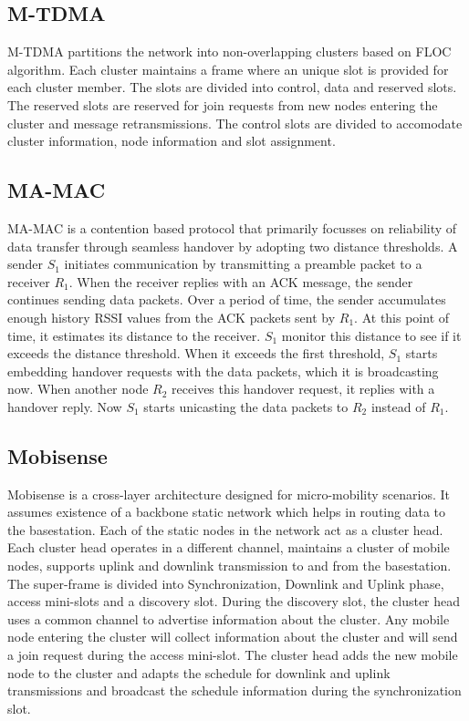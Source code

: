 \documentclass[a4paper, conference, 10pt]{IEEEtran}
\begin{document}
\subsection{M-TDMA}
M-TDMA \cite{m-tdma} partitions the network into non-overlapping clusters based on FLOC algorithm\cite{floc}. Each cluster maintains a frame where an unique slot is provided for each cluster member. The slots are divided into control, data and reserved slots. The reserved slots are reserved for join requests from new nodes entering the cluster and message retransmissions. The control slots are divided to accomodate cluster information, node information and slot assignment. 

\subsection{MA-MAC}
MA-MAC \cite{ma-mac} is a contention based protocol that primarily focusses on reliability of data transfer through seamless handover by adopting two distance thresholds. A sender \emph{$S_1$} initiates communication by transmitting a preamble packet to a receiver \emph{$R_1$}. When the receiver replies with an ACK message, the sender continues sending data packets. Over a period of time, the sender accumulates enough history RSSI values from the ACK packets sent by \emph{$R_1$}. At this point of time, it estimates its distance to the receiver. \emph{$S_1$} monitor this distance to see if it exceeds the distance threshold. When it exceeds the first threshold, \emph{$S_1$} starts embedding handover requests with the data packets, which it is broadcasting now. When another node \emph{$R_2$} receives this handover request, it replies with a handover reply. Now \emph{$S_1$} starts unicasting the data packets to \emph{$R_2$} instead of \emph{$R_1$}.  
 
\subsection{Mobisense}
Mobisense \cite{mobisense} is a cross-layer architecture designed for micro-mobility scenarios. It assumes existence of a backbone static network which helps in routing data to the basestation. Each of the static nodes in the network act as a cluster head. Each cluster head operates in a different channel, maintains a cluster of mobile nodes, supports uplink and downlink transmission to and from the basestation. The super-frame is divided into Synchronization, Downlink and Uplink phase, access mini-slots and a discovery slot. During the discovery slot, the cluster head uses a common channel to  advertise information about the cluster. Any mobile node entering the cluster will collect information about the cluster and will send a join request during the access mini-slot. The cluster head adds the new mobile node to the cluster and adapts the schedule for downlink and uplink transmissions and broadcast the schedule information during the synchronization slot.  
\end{document}
